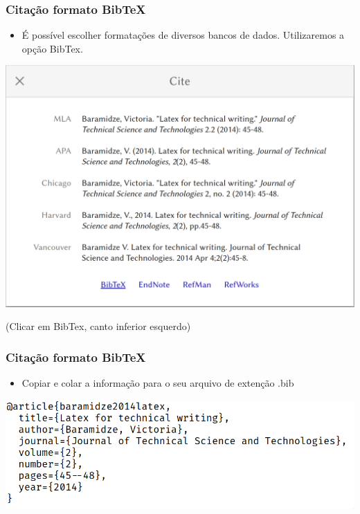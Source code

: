 \documentclass{beamer}
\begin{document}
\begin{frame}

  \frametitle{Citação formato BibTeX}

  \begin{itemize}
  \item É possível escolher formatações de diversos bancos de
    dados. Utilizaremos a opção BibTex.
\end{itemize}

\vspace{0.2cm}

\begin{center}
  \includegraphics[scale=0.15]{../Imagens/A2I103.png}
\end{center}
\center
(Clicar em BibTex, canto inferior esquerdo)


\end{frame}

\begin{frame}

  \frametitle{Citação formato BibTeX}

  \begin{itemize}
  \item Copiar e colar a informação para o seu arquivo de extenção .bib
\end{itemize}

\vspace{0.2cm}

\begin{center}
  \includegraphics[scale=0.30]{../Imagens/A2I104.png}
\end{center}


\end{frame}
\end{document}
